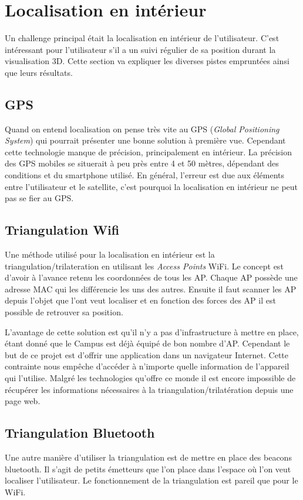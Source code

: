 \section{Localisation en intérieur}
Un challenge principal était la localisation en intérieur de l'utilisateur. C'est intéressant pour l'utilisateur s'il a un suivi régulier de sa position durant la visualisation 3D. Cette section va expliquer les diverses pistes empruntées ainsi que leurs résultats.

\subsection{GPS}
Quand on entend localisation on pense très vite au GPS (\textit{Global Positioning System}) qui pourrait présenter une bonne solution à première vue. Cependant cette technologie manque de précision, principalement en intérieur. La précision des GPS mobiles se situerait à peu près entre 4 et 50 mètres, dépendant des conditions et du smartphone utilisé. En général, l'erreur est due aux éléments entre l'utilisateur et le satellite, c'est pourquoi la localisation en intérieur ne peut pas se fier au GPS.

\subsection{Triangulation Wifi}
Une méthode utilisé pour la localisation en intérieur est la triangulation/trilateration en utilisant les \textit{Access Points} WiFi. Le concept est d'avoir à l'avance retenu les coordonnées de tous les AP. Chaque AP possède une adresse MAC qui les différencie les uns des autres. Ensuite il faut scanner les AP depuis l'objet que l'ont veut localiser et en fonction des forces des AP il est possible de retrouver sa position.

L'avantage de cette solution est qu'il n'y a pas d'infrastructure à mettre en place, étant donné que le Campus est déjà équipé de bon nombre d'AP. Cependant le but de ce projet est d'offrir une application dans un navigateur Internet. Cette contrainte nous empêche d'accéder à n'importe quelle information de l'appareil qui l'utilise. Malgré les technologies qu'offre ce monde il est encore impossible de récupérer les informations nécessaires à la triangulation/trilatération depuis une page web.

\subsection{Triangulation Bluetooth}
Une autre manière d'utiliser la triangulation est de mettre en place des beacons bluetooth. Il s'agit de petits émetteurs que l'on place dans l'espace où l'on veut localiser l'utilisateur. Le fonctionnement de la triangulation est pareil que pour le WiFi.


